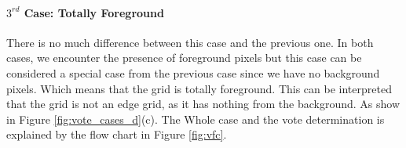 \documentclass[12pt,fleqn]{book} %
\begin{document}
\paragraph{$3^{rd}$ Case: Totally Foreground}
There is no much difference between this case and the previous one. In both cases, we encounter the presence of foreground pixels but this case can be considered a special case from the previous case since we have no background pixels. Which means that the grid is totally foreground. This can be interpreted that the grid is not an edge grid, as it has nothing from the background. As show in Figure \ref{fig:vote_cases_d}(c).
The Whole case and the vote determination is explained by the flow chart in Figure \ref{fig:vfc}.
\begin{figure}[h]
\end{figure}
\end{document}
